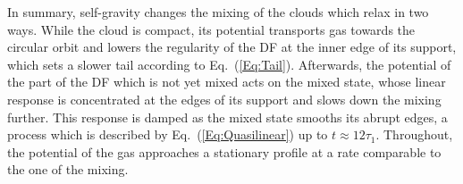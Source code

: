 In summary, self-gravity changes the mixing of the clouds which relax in two ways. While the cloud is compact, its potential transports gas towards the circular orbit and lowers the regularity of the DF at the inner edge of its support, which sets a slower tail according to Eq.~(\ref{Eq:Tail}). Afterwards, the potential of the part of the DF which is not yet mixed acts on the mixed state, whose linear response is concentrated at the edges of its support and slows down the mixing further. This response is damped as the mixed state smooths its abrupt edges, a process which is described by Eq.~(\ref{Eq:Quasilinear}) up to $t\approx 12\tau_1$. Throughout, the potential of the gas approaches a stationary profile at a rate comparable to the one of the mixing.
